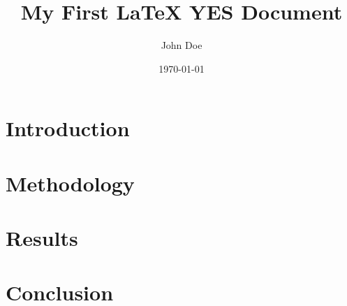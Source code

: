 \documentclass{article}
\title{My First LaTeX YES Document}
\author{John Doe}
\date{\today}
\begin{document}
\maketitle

\section{Introduction}

\lipsum[1]

\section{Methodology}

\lipsum[2]

\section{Results}

\lipsum[3]

\section{Conclusion}

\lipsum[4]
\end{document}

